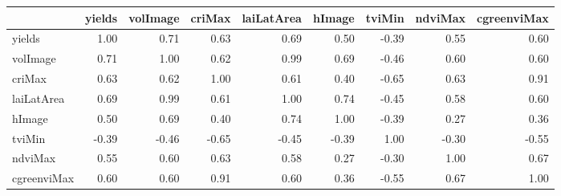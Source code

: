 \begin{tabular}{lrrrrrrrr}
\toprule
{} &  yields &  volImage &  criMax &  laiLatArea &  hImage &  tviMin &  ndviMax &  cgreenviMax \\
\midrule
yields      &    1.00 &      0.71 &    0.63 &        0.69 &    0.50 &   -0.39 &     0.55 &         0.60 \\
volImage    &    0.71 &      1.00 &    0.62 &        0.99 &    0.69 &   -0.46 &     0.60 &         0.60 \\
criMax      &    0.63 &      0.62 &    1.00 &        0.61 &    0.40 &   -0.65 &     0.63 &         0.91 \\
laiLatArea  &    0.69 &      0.99 &    0.61 &        1.00 &    0.74 &   -0.45 &     0.58 &         0.60 \\
hImage      &    0.50 &      0.69 &    0.40 &        0.74 &    1.00 &   -0.39 &     0.27 &         0.36 \\
tviMin      &   -0.39 &     -0.46 &   -0.65 &       -0.45 &   -0.39 &    1.00 &    -0.30 &        -0.55 \\
ndviMax     &    0.55 &      0.60 &    0.63 &        0.58 &    0.27 &   -0.30 &     1.00 &         0.67 \\
cgreenviMax &    0.60 &      0.60 &    0.91 &        0.60 &    0.36 &   -0.55 &     0.67 &         1.00 \\
\bottomrule
\end{tabular}
